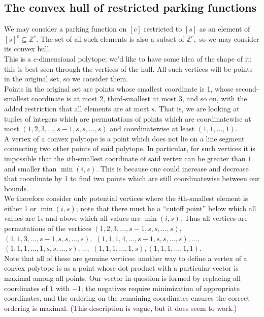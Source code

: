 \subsection*{The convex hull of restricted parking functions}

We may consider a parking function on $[c]$ restricted to $[s]$ as an element of $[s]^c\subseteq \mathbb{Z}^c.$ The set of all such elements is also a subset of $\mathbb{Z}^c,$ so we may consider its convex hull.\\

This is a $c$-dimensional polytope; we'd like to have some idea of the shape of it; this is best seen through the vertices of the hull. All such vertices will be points in the original set, so we consider them.\\

Points in the original set are points whose smallest coordinate is 1, whose second-smallest coordinate is at most 2, third-smallest at most 3, and so on, with the added restriction that all elements are at most $s.$ That is, we are looking at tuples of integers which are permutations of points which are coordinatewise at most $(1,2,3,...,s-1,s,s,...,s)$ and coordinatewise at least $(1,1,...,1).$\\

A vertex of a convex polytope is a point which does not lie on a line segment connecting two other points of said polytope. In particular, for such vertices it is impossible that the $i$th-smallest coordinate of said vertex can be greater than $1$ and smaller than $\min(i,s).$ This is because one could increase and decrease that coordinate by 1 to find two points which are still coordinatewise between our bounds.\\

We therefore consider only potential vertices where the $i$th-smallest element is either 1 or $\min(i,s)$; note that there must be a ``cutoff point'' below which all values are 1s and above which all values are $\min(i,s).$ Thus all vertices are permutations of the vertices $(1,2,3,...,s-1,s,s,...,s),$ $(1,1,3,...,s-1,s,s,...,s),$ $(1,1,1,4,...,s-1,s,s,...,s),...,$ $(1,1,1,...,1,s,s,...,s),...,$ $(1,1,1,...,1,s),(1,1,1,...,1,1).$\\

Note that all of these are genuine vertices: another way to define a vertex of a convex polytope is as a point whose dot product with a particular vector is maximal among all points. Our vector in question is formed by replacing all coordinates of $1$ with $-1$; the negatives require minimization of appropriate coordinates, and the ordering on the remaining coordinates ensures the correct ordering is maximal. (This description is vague, but it does seem to work.)\\


